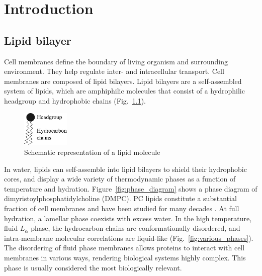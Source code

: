 \chapter{Introduction}
\section{Lipid bilayer}
Cell membranes define the boundary of living organism
and surrounding environment. They help regulate inter- and intracellular
transport. Cell membranes are composed of lipid bilayers.
Lipid bilayers are a self-assembled system of lipids, which are 
amphiphilic molecules that consist of a hydrophilic headgroup
and hydrophobic chains (Fig.~\ref{fig:lipid}).

\begin{figure}
  \centering
  \includegraphics[width=0.2\textwidth]{figures/lipid}
  \caption{Schematic representation of a lipid molecule}
  \label{fig:lipid}
\end{figure}

In water, lipids can self-assemble into lipid bilayers to shield their hydrophobic 
cores, and display a wide variety of thermodynamic phases
as a function of temperature and hydration. Figure~\ref{fig:phase_diagram}
shows a phase diagram of dimyristoylphosphatidylcholine (DMPC).
PC lipids constitute a substantial fraction of cell membranes
and have been studied for many decades \cite{Nagle00}.
At full hydration, a lamellar phase coexists with excess water.
In the high temperature, fluid $L_\alpha$ phase, the hydrocarbon chains 
are conformationally disordered, and intra-membrane molecular correlations 
are liquid-like \cite{ref:Fahey78} (Fig.~\ref{fig:various_phases}).
The disordering of fluid phase membranes allows proteins to 
interact with cell membranes in various ways, rendering biological systems
highly complex. 
This phase is usually considered the most biologically relevant.

